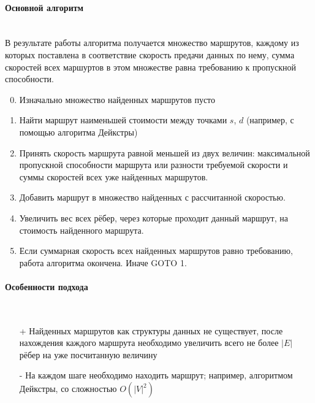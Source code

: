 \documentclass[a4paper]{article}
\begin{document}
\paragraph{Основной алгоритм}\mbox{}\\
В результате работы алгоритма получается множество маршрутов, каждому из которых поставлена в соответствие скорость предачи данных по нему, сумма скоростей всех маршуртов в этом множестве равна требованию к пропускной способности.
\begin{enumerate}
\setcounter{enumi}{-1}
\item Изначально множество найденных маршрутов пусто
\item Найти маршрут наименьшей стоимости между точками $s$, $d$ (например, с помощью алгоритма Дейкстры) 
\item Принять скорость маршрута равной меньшей из двух величин: максимальной пропускной способности маршрута или разности требуемой скорости и суммы скоростей всех уже найденных маршрутов.
\item Добавить маршрут в множество найденных с рассчитанной скоростью. 
\item Увеличить вес всех рёбер, через которые проходит данный маршрут, на стоимость найденного маршрута.
\item Если суммарная скорость всех найденных маршрутов равно требованию, работа алгоритма окончена. Иначе  GOTO 1.
\end{enumerate}

\paragraph{Особенности подхода}\mbox{}\\
\begin{itemize}
\item[+] Найденных маршрутов как структуры данных не существует, после нахождения каждого маршрута необходимо увеличить всего не более $|E|$ рёбер на уже посчитанную величину
\item[-] На каждом шаге необходимо находить маршрут; например, алгоритмом Дейкстры, со сложностью $O(|V|^2)$
\end{itemize}
\end{document}
